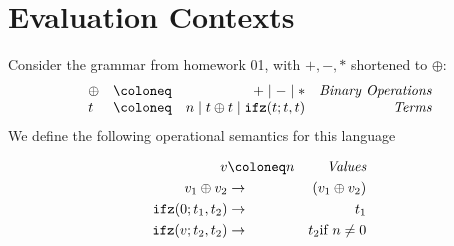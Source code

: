 \section*{Evaluation Contexts}
Consider the grammar from homework 01, with $+,-,*$ shortened to $\oplus$:
\[
  \begin{array}{l c r r}
    \oplus & \coloneq & + \mid - \mid * & \emph{Binary Operations}\\
    t & \coloneq & n \mid t \oplus t  \mid \mathtt{ifz}(t;t,t) & \emph{Terms}\\
  \end{array}
\]
We define the following operational semantics for this language

\begin{align*}
  v & \coloneq n & \emph{Values}\\
  v_1 \oplus v_2 & \rightarrow & (v_1\oplus v_2)\\
  \mathtt{ifz}(0;t_1,t_2) & \rightarrow &  t_1\\
  \mathtt{ifz}(v;t_2,t_2) & \rightarrow & t_2 \text{if } n\neq 0\\
\end{align*}

\begin{minipage}{\textwidth}
  \begin{minipage}{0.3\textwidth}
    \begin{prooftree}
    \end{prooftree}
  \end{minipage}
  \hfill
  \begin{minipage}{0.3\textwidth}
    \begin{prooftree}
    \end{prooftree}
  \end{minipage}
  \hfill
  \begin{minipage}{0.3\textwidth}
    \begin{prooftree}
    \end{prooftree}
  \end{minipage}
  \hfill
  \vspace{2em}
\end{minipage}

